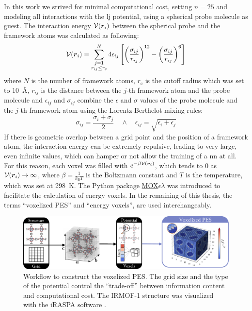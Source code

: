 In this work we strived for minimal computational cost, setting $n=\num{25}$ and
modeling all interactions with the \gls{lj} potential, using a spherical probe molecule as guest.
The interaction energy $\mathcal{V}(\boldsymbol{r}_i)$ between the spherical probe and the
framework atoms was calculated as following:
\begin{equation}
	\label{eq:lj_potential}
	\mathcal{V}(\boldsymbol{r}_i) =
	\sum_{\substack{j=1 \\ r_{ij} \leq r_\mathrm{c}}}^N 4\epsilon_{ij}
	\left[
		\left(\frac{\sigma_{ij}}{r_{ij}}\right)^{12}
		- 
		\left(\frac{\sigma_{ij}}{r_{ij}}\right)^{6}
	\right]
\end{equation}
where $N$ is the number of framework atoms, $r_\mathrm{c}$ is the cutoff
radius which was set to \SI{10}{\angstrom}, $r_{ij}$ is the
distance between the $j$-th framework atom and the probe molecule and
$\epsilon_{ij}$ and $\sigma_{ij}$ combine the $\epsilon$ and $\sigma$ values of
the probe molecule and the $j$-th framework atom using the Lorentz-Berthelot
mixing rules:
\begin{equation}
	\sigma_{ij} = \frac{\sigma_i + \sigma_j}{2}
	\quad
	\land
	\quad
	\epsilon_{ij} = \sqrt{\epsilon_i + \epsilon_j}
\end{equation}
If there is geometric overlap between a grid point and the position of a
framework atom, the interaction energy can be extremely repulsive, leading to
very large, even infinite values, which can hamper or not allow the training of
a \gls{nn} at all. For this reason, each voxel was filled with
$e^{-\beta\mathcal{V}(\boldsymbol{r}_i)}$, which tends to \num{0} as $\mathcal{V}(\boldsymbol{r}_i) \to
\infty$, where $\beta = \frac{1}{k_\mathrm{B}T}$ is the Boltzmann
constant and $T$ is the
temperature, which was set at \SI{298}{\kelvin}. The Python
package
\href{https://github.com/frudakis-research-group/moxel}{MOX$\epsilon\lambda$}
was introduced to facilitate the calculation of energy voxels. In the remaining
of this thesis, the terms ``voxelized PES'' and ``energy voxels'', are used interchangeably.

\begin{figure}
	\centering
	\includegraphics[width=\textwidth]{fig/voxelized_pes.pdf}
	\caption[Workflow to construct the voxelized PES.]{Workflow to construct the
	voxelized PES. The grid size and the type of the potential control the
	``trade-off'' between information content and computational cost. The
	IRMOF-1 structure was visualized with the iRASPA software
	\parencite{Dubbeldam2018}.}
	\label{fig:voxelized_pes}
\end{figure}

